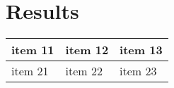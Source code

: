 \chapter{Results}

\begin{center}
\begin{tabularx}{0.8\textwidth} {
  | >{\raggedright\arraybackslash}X 
  | >{\centering\arraybackslash}X 
  | >{\raggedleft\arraybackslash}X | 
}
\hline
item 11 & item 12 & item 13 \\
\hline
item 21  & item 22  & item 23  \\
\hline
\end{tabularx}
\end{center}